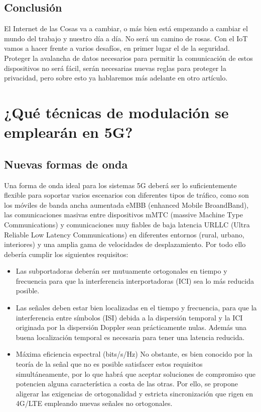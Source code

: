 \documentclass[]{article}
\begin{document}
\subsection{Conclusión}

El Internet de las Cosas va a cambiar, o más bien está empezando a cambiar el mundo del trabajo y nuestro día a día. No será un camino de rosas. Con el IoT vamos a hacer frente a varios desafíos, en primer lugar el de la seguridad. Proteger la avalancha de datos necesarios para permitir la comunicación de estos dispositivos no será fácil, serán necesarias nuevas reglas para proteger la privacidad, pero sobre esto ya hablaremos más adelante en otro artículo.\\

 

\section{¿Qué técnicas de modulación se emplearán en 5G?}

\subsection{Nuevas formas de onda}

Una forma de onda ideal para los sistemas 5G deberá ser lo suficientemente flexible para soportar varios escenarios con diferentes tipos de tráfico, como son los móviles de banda ancha aumentada eMBB (enhanced Mobile BroandBand), las comunicaciones masivas entre dispositivos mMTC (massive Machine Type Communications) y comunicaciones muy fiables de baja latencia URLLC (Ultra Reliable Low Latency Communications) en diferentes entornos (rural, urbano, interiores) y una amplia gama de velocidades de desplazamiento. Por todo ello debería cumplir los siguientes requisitos:

\begin{itemize}
	\item Las subportadoras deberán ser mutuamente ortogonales en tiempo y frecuencia para que la interferencia interportadoras (ICI) sea lo más reducida posible. 
	\item Las señales deben estar bien localizadas en el tiempo y frecuencia, para que la interferencia entre símbolos (ISI) debida a la dispersión temporal y la ICI originada por la dispersión Doppler sean prácticamente nulas. Además una buena localización temporal es necesaria para tener una latencia reducida. 
	\item Máxima eficiencia espectral (bits/s/Hz)
	No obstante, es bien conocido por la teoría de la señal que no es posible satisfacer estos requisitos simultáneamente, por lo que habrá que aceptar soluciones de compromiso que potencien alguna característica a costa de las otras. Por ello, se propone aligerar las exigencias de ortogonalidad y estricta sincronización que rigen en 4G/LTE empleando nuevas señales no ortogonales. 
\end{itemize}
\end{document}
